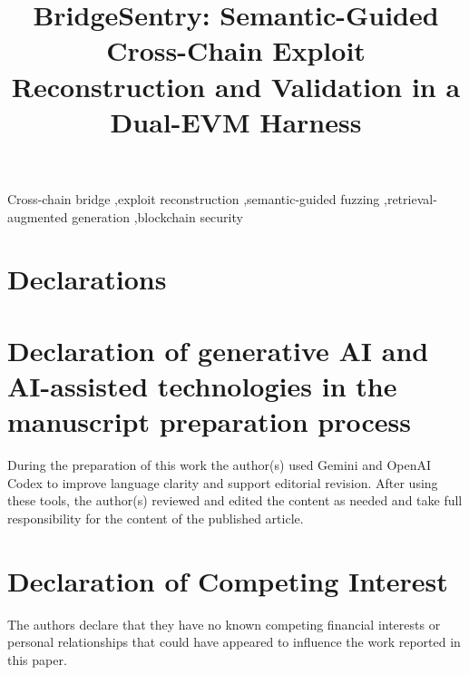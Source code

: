 \documentclass[a4paper]{cas-sc}
\begin{document}
\title[mode=title]{BridgeSentry: Semantic-Guided Cross-Chain Exploit Reconstruction and Validation in a Dual-EVM Harness}




\begin{keywords}
Cross-chain bridge \sep exploit reconstruction \sep semantic-guided fuzzing \sep retrieval-augmented generation \sep blockchain security
\end{keywords}

\maketitle









\section*{Declarations}

\section*{Declaration of generative AI and AI-assisted technologies in the manuscript preparation process}
During the preparation of this work the author(s) used Gemini and OpenAI Codex to improve language clarity and support editorial revision. After using these tools, the author(s) reviewed and edited the content as needed and take full responsibility for the content of the published article.

\section*{Declaration of Competing Interest}
The authors declare that they have no known competing financial interests or personal relationships that could have appeared to influence the work reported in this paper.
\end{document}
